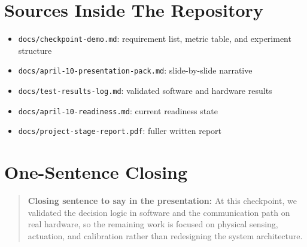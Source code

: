 \documentclass[11pt,a4paper]{article}
\begin{document}
\section{Sources Inside The Repository}

\begin{itemize}
  \item \texttt{docs/checkpoint-demo.md}: requirement list, metric table, and experiment structure
  \item \texttt{docs/april-10-presentation-pack.md}: slide-by-slide narrative
  \item \texttt{docs/test-results-log.md}: validated software and hardware results
  \item \texttt{docs/april-10-readiness.md}: current readiness state
  \item \texttt{docs/project-stage-report.pdf}: fuller written report
\end{itemize}

\section{One-Sentence Closing}

\begin{quote}
\textbf{Closing sentence to say in the presentation:} At this checkpoint, we validated the decision logic in software and the communication path on real hardware, so the remaining work is focused on physical sensing, actuation, and calibration rather than redesigning the system architecture.
\end{quote}
\end{document}
